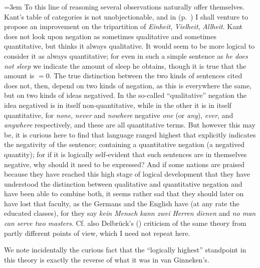 \emergencystretch=3em
To this line of reasoning several observations naturally offer themselves. Kant's table of categories is not unobjectionable, and in  (p.~\pageref{08-better-tripartition}) %
I shall venture to propose an improvement on the tripartition of \textit{Einheit}, \textit{Vielheit}, \textit{Allheit}. Kant does not look upon negation as sometimes qualitative and sometimes quantitative, but thinks it always qualitative. It would seem to be more logical to consider it as always quantitative; for even in such a simple sentence as \textit{he does not sleep} we indicate the amount of sleep he obtains, though it is true that the amount is \( = 0 \). The true distinction between the two kinds of sentences cited does not, then, depend on two kinds of negation, as this is everywhere the same, but on two kinds of ideas negatived. In the so-called ``qualitative'' negation the idea negatived is in itself non-quantitative, while in the other it is in itself quantitative, for \textit{none}, \textit{never} and \textit{nowhere} negative \textit{one} (or \textit{any}), \textit{ever}, and \textit{anywhere} respectively, and these are all quantitative terms. But however this may be, it is curious here to find that language ranged highest that explicitly indicates the negativity of the sentence; containing a quantitative negation (a negatived quantity); for if it is logically self-evident that such sentences are in themselves negative, why should it need to be expressed? And if some nations are praised because they have reached this high stage of logical development that they have understood the distinction between qualitative and quantitative negation and have been able to combine both, it seems rather sad that they should later on have lost that faculty, as the Germans and the English have (at any rate the educated classes), for they say \textit{kein Mensch kann zwei Herren dienen} and \textit{no man can serve two masters}. Cf. also Delbrück's (\citeyear[36 ff]{delbruck_negativen_1910}) criticism of the same theory from partly different points of view, which I need not repeat here. %

We note incidentally the curious fact that the ``logically highest'' standpoint in this theory is exactly the reverse of what it was in van Ginneken's.

